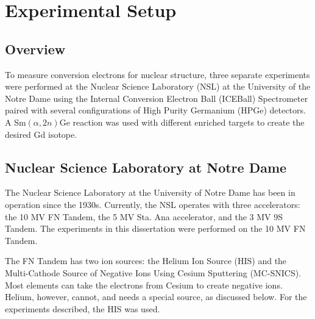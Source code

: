 %
%
%
%
%
%
%
%
%
%


%
%

\chapter{Experimental Setup}

\section{Overview}

To measure conversion electrons for nuclear structure, three separate experiments were performed at the Nuclear Science Laboratory (NSL) at the University of the Notre Dame using the Internal Conversion Electron Ball (ICEBall) Spectrometer paired with several configurations of High Purity Germanium (HPGe) detectors. A Sm$(\alpha,2n)$Ge reaction was used with different enriched targets to create the desired Gd isotope.

\section{Nuclear Science Laboratory at Notre Dame}

The Nuclear Science Laboratory at the University of Notre Dame has been in operation since the 1930s. Currently, the NSL operates with three accelerators: the 10 MV FN Tandem, the 5 MV Sta. Ana accelerator, and the 3 MV 9S Tandem. The experiments in this dissertation were performed on the 10 MV FN Tandem.

The FN Tandem has two ion sources: the Helium Ion Source (HIS) and the Multi-Cathode Source of Negative Ions Using Cesium Sputtering (MC-SNICS). Most elements can take the electrons from Cesium to create negative ions. Helium, however, cannot, and needs a special source, as discussed below. For the experiments described, the HIS was used.

